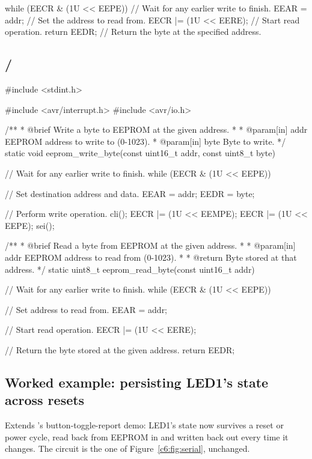 \begin{ccode}
while (EECR & (1U << EEPE)) {} // Wait for any earlier write to finish.
EEAR = addr;                   // Set the address to read from.
EECR |= (1U << EERE);          // Start read operation.
return EEDR;                   // Return the byte at the specified address.
\end{ccode}

\subsection{ / }
\label{c7:a:3}

\begin{ccode}
#include <stdint.h>

#include <avr/interrupt.h>
#include <avr/io.h>

/**
 * @brief Write a byte to EEPROM at the given address.
 *
 * @param[in] addr EEPROM address to write to (0-1023).
 * @param[in] byte Byte to write.
 */
static void eeprom_write_byte(const uint16_t addr, const uint8_t byte)
{
    // Wait for any earlier write to finish.
    while (EECR & (1U << EEPE)) {}

    // Set destination address and data.
    EEAR = addr;
    EEDR = byte;

    // Perform write operation.
    cli();
    EECR |= (1U << EEMPE);
    EECR |= (1U << EEPE);
    sei();
}

/**
 * @brief Read a byte from EEPROM at the given address.
 *
 * @param[in] addr EEPROM address to read from (0-1023).
 *
 * @return Byte stored at that address.
 */
static uint8_t eeprom_read_byte(const uint16_t addr)
{
    // Wait for any earlier write to finish.
    while (EECR & (1U << EEPE)) {}

    // Set address to read from.
    EEAR = addr;

    // Start read operation.
    EECR |= (1U << EERE);

    // Return the byte stored at the given address.
    return EEDR;
}
\end{ccode}

\subsection{Worked example: persisting LED1's state across resets}
\label{c7:a:4}
Extends 's button-toggle-report demo: LED1's state now survives a reset or power
cycle, read back from EEPROM in  and written back out every time it changes. The
circuit is the one of Figure~\ref{c6:fig:serial}, unchanged.

